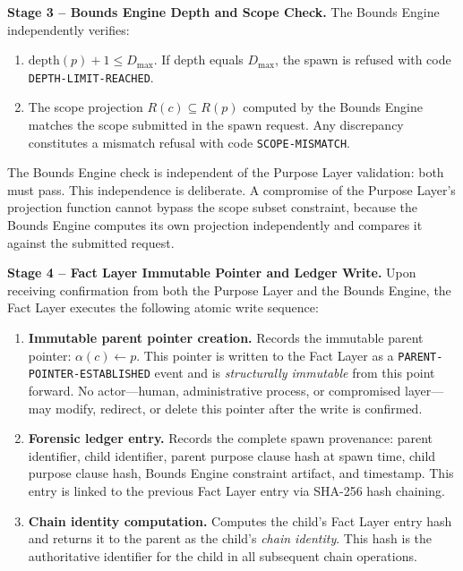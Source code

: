 \bigskip
\noindent\textbf{Stage 3 -- Bounds Engine Depth and Scope Check.} The Bounds Engine independently verifies:

\begin{enumerate}
  \item[(BE-V1)] $\mathrm{depth}(p) + 1 \leq D_{\max}$. If depth equals $D_{\max}$, the spawn is refused with code \texttt{DEPTH-LIMIT-REACHED}.
  \item[(BE-V2)] The scope projection $R(c) \subseteq R(p)$ computed by the Bounds Engine matches the scope submitted in the spawn request. Any discrepancy constitutes a mismatch refusal with code \texttt{SCOPE-MISMATCH}.
\end{enumerate}

The Bounds Engine check is independent of the Purpose Layer validation: both must pass. This independence is deliberate. A compromise of the Purpose Layer's projection function cannot bypass the scope subset constraint, because the Bounds Engine computes its own projection independently and compares it against the submitted request.

\bigskip
\noindent\textbf{Stage 4 -- Fact Layer Immutable Pointer and Ledger Write.} Upon receiving confirmation from both the Purpose Layer and the Bounds Engine, the Fact Layer executes the following atomic write sequence:

\begin{enumerate}
  \item[(FL-W1)] \textbf{Immutable parent pointer creation.} Records the immutable parent pointer: $\alpha(c) \gets p$. This pointer is written to the Fact Layer as a \texttt{PARENT-POINTER-ESTABLISHED} event and is \emph{structurally immutable} from this point forward. No actor---human, administrative process, or compromised layer---may modify, redirect, or delete this pointer after the write is confirmed.
  \item[(FL-W2)] \textbf{Forensic ledger entry.} Records the complete spawn provenance: parent identifier, child identifier, parent purpose clause hash at spawn time, child purpose clause hash, Bounds Engine constraint artifact, and timestamp. This entry is linked to the previous Fact Layer entry via SHA-256 hash chaining.
  \item[(FL-W3)] \textbf{Chain identity computation.} Computes the child's Fact Layer entry hash and returns it to the parent as the child's \emph{chain identity}. This hash is the authoritative identifier for the child in all subsequent chain operations.
\end{enumerate}

